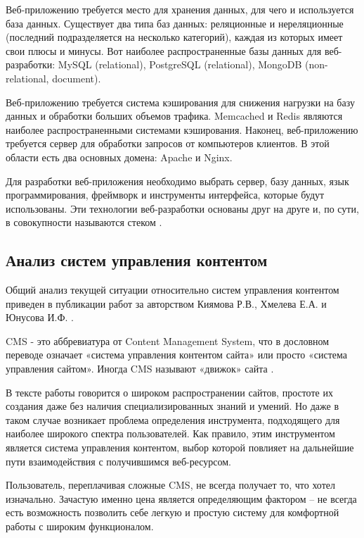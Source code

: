 Веб-приложению требуется место для хранения данных, для чего и используется база данных.
Существует два типа баз данных: реляционные и нереляционные (последний подразделяется на несколько категорий), каждая из которых имеет свои плюсы и минусы.
Вот наиболее распространенные базы данных для веб-разработки: MySQL (relational), PostgreSQL (relational), MongoDB (non-relational, document).

Веб-приложению требуется система кэширования для снижения нагрузки на базу данных и обработки больших объемов трафика.
Memcached и Redis являются наиболее распространенными системами кэширования.
Наконец, веб-приложению требуется сервер для обработки запросов от компьютеров клиентов.
В этой области есть два основных домена: Apache и Nginx.

Для разработки веб-приложения необходимо выбрать сервер, базу данных, язык программирования, фреймворк и инструменты интерфейса, которые будут использованы.
Эти технологии веб-разработки основаны друг на друге и, по сути, в совокупности называются стеком \cite{ualiev-jebegenov-issledovanie-1}.


\subsection{Анализ систем управления контентом}

Общий анализ текущей ситуации относительно систем управления контентом приведен в публикации работ за авторством Киямова Р.В., Хмелева Е.А. и Юнусова И.Ф. \cite{kiyamov-cms}.

CMS - это аббревиатура от Content Management System, что в дословном переводе означает «система управления контентом сайта» или просто «система управления сайтом».
Иногда CMS называют «движок» сайта \cite{kiyamov-cms-1}.

В тексте работы говорится о широком распространении сайтов, простоте их создания даже без наличия специализированных знаний и умений.
Но даже в таком случае возникает проблема определения инструмента, подходящего для наиболее широкого спектра пользователей.
Как правило, этим инструментом является система управления контентом, выбор которой повлияет на дальнейшие пути взаимодействия с получившимся веб-ресурсом.

Пользователь, переплачивая сложные CMS, не всегда получает то, что хотел изначально.
Зачастую именно цена является определяющим фактором -- не всегда есть возможность позволить себе легкую и простую систему для комфортной работы с широким функционалом.

